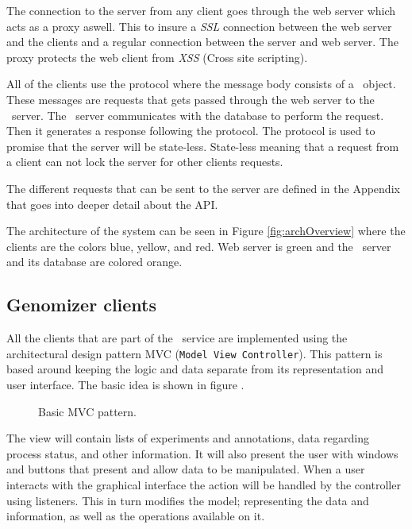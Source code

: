The connection to the server from any client goes through the web server which acts as a proxy aswell. This to insure a \textit{SSL} connection between the web server and the clients and a regular connection between the server and web server. The proxy protects the web client from \textit{XSS} (Cross site scripting). 

All of the clients use the  protocol where the message body consists of a \json\ object.
These messages are requests that gets passed through the web server to the \appName\ server. The \appName\ server communicates with the database to perform the request. Then it generates a response following the  protocol. The  protocol is used to promise that the server will be state-less. State-less meaning that a request from a client can not lock the server for other clients requests. 

The different requests that can be sent to the server are defined in the Appendix  that goes into deeper detail about the API.

The architecture of the system can be seen in Figure \ref{fig:archOverview} where the clients are the colors blue, yellow, and red. Web server is green and the \appName\ server and its database are colored orange.

\subsection{Genomizer clients}

All the clients that are part of the \appName\ service are implemented using the architectural design pattern MVC (\texttt{Model View Controller}). This pattern is based around keeping the logic and data separate from its representation and user interface. The basic idea is shown in figure .

\begin{figure}[htb]
\caption{Basic MVC pattern.}
\label{fig:MVCimage}
\end{figure}

 The view will contain lists of experiments and annotations, data regarding process status, and other information. It will also present the user with windows and buttons that present and allow data to be manipulated. When a user interacts with the graphical interface the action will be handled by the controller using listeners. This in turn modifies the model; representing the data and information, as well as the operations available on it. 
 
